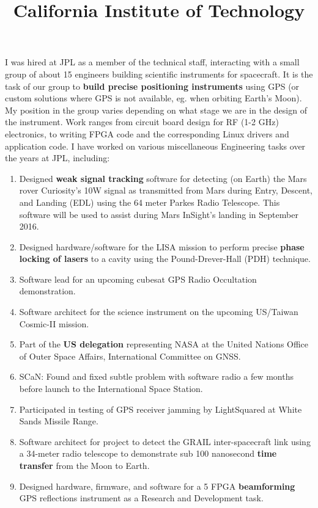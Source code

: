 \begin{resume}
\title{\bf California Institute of Technology}
\begin{position}
    I was hired at JPL as a member of the technical staff, interacting with a small group of about 15 engineers building scientific instruments for spacecraft. It is the task of our group to {\bf build precise positioning instruments} using GPS (or custom solutions where GPS is not available, eg. when orbiting Earth's Moon). My position in the group varies depending on what stage we are in the design of the instrument. Work ranges from circuit board design for RF (1-2 GHz) electronics, to writing FPGA code and the corresponding Linux drivers and application code. I have worked on various miscellaneous Engineering tasks over the years at JPL, including:
    \begin{enumerate}
        \item Designed {\bf weak signal tracking} software for detecting (on Earth) the Mars rover Curiosity's 10W signal as transmitted from Mars during Entry, Descent, and Landing (EDL) using the 64 meter Parkes Radio Telescope. This software will be used to assist during Mars InSight's landing in September 2016.
        \item Designed hardware/software for the LISA mission to perform precise {\bf phase locking of lasers} to a cavity using the Pound-Drever-Hall (PDH) technique.
        \item Software lead for an upcoming cubesat GPS Radio Occultation demonstration.
        \item Software architect for the science instrument on the upcoming US/Taiwan Cosmic-II mission.
        \item Part of the {\bf US delegation} representing NASA at the United Nations Office of Outer Space Affairs, International Committee on GNSS.
        \item SCaN: Found and fixed subtle problem with software radio a few months before launch to the International Space Station.
        \item Participated in testing of GPS receiver jamming by LightSquared at White Sands Missile Range.
        \item Software architect for project to detect the GRAIL inter-spacecraft link using a 34-meter radio telescope to demonstrate sub 100 nanosecond {\bf time transfer} from the Moon to Earth.
        \item Designed hardware, firmware, and software for a 5 FPGA {\bf beamforming} GPS reflections instrument as a Research and Development task.
    \end{enumerate}



\end{position}
\end{resume}
